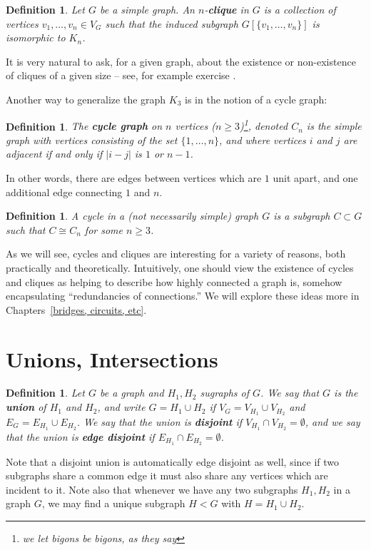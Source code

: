 \documentclass[12pt]{report}
\theoremstyle{plain}
\newtheorem{defn}[thm]{Definition}
\newcommand{\Xb}[1]{\textbf{#1}\index{#1}}
\begin{document}
\begin{defn}
Let $G$ be a simple graph. An $n$-\Xb{clique} in $G$ is a collection of
vertices $v_1, \ldots, v_n \in V_G$ such that the induced subgraph
$G[\{v_1, \ldots, v_n\}]$ is isomorphic to $K_n$.
\end{defn}

It is very natural to ask, for a given graph, about the existence or
non-existence of cliques of a given size -- see, for example exercise
\label{ramsey 6}.

Another way to generalize the graph $K_3$ is in the notion of a cycle graph:
\begin{defn}
The \Xb{cycle graph} on $n$ vertices ($n \geq 3$)\footnote{we let bigons be
bigons, as they say}, denoted $C_n$ is the simple graph with vertices
consisting of the set $\{1, \ldots, n\}$, and where vertices $i$ and $j$
are adjacent if and only if $|i - j|$ is $1$ or $n-1$.
\end{defn}
In other words, there are edges between vertices which are $1$ unit apart,
and one additional edge connecting $1$ and $n$.

\begin{defn}
A cycle in a (not necessarily simple) graph $G$ is a subgraph $C \subset G$
such that $C \cong C_n$ for some $n \geq 3$.
\end{defn}

As we will see, cycles and cliques are interesting for a variety of
reasons, both practically and theoretically. Intuitively,
one should view the existence of cycles and cliques as helping to describe
how highly connected a graph is, somehow encapsulating ``redundancies of
connections.'' We will explore these ideas more in Chapters~\ref{bridges,
circuits, etc}.

\section{Unions, Intersections}

\begin{defn}
Let $G$ be a graph and $H_1, H_2$ sugraphs of $G$. We say that $G$ is the
\textbf{union} of $H_1$ and $H_2$, and write $G = H_1
\cup H_2$ if $V_G = V_{H_1} \cup V_{H_2}$ and $E_G = E_{H_1} \cup
E_{H_2}$. We say that the union is \textbf{disjoint}
if $V_{H_1} \cap V_{H_2} = \emptyset$, and we say that the union is
\textbf{edge disjoint} if $E_{H_1} \cap
E_{H_2} = \emptyset$.
\end{defn}
Note that a disjoint union is automatically edge disjoint as well, since if
two subgraphs share a common edge it must also share any vertices which are
incident to it. Note also that whenever we have any two subgraphs $H_1,
H_2$ in a graph $G$, we may find a unique subgraph $H < G$ with $H = H_1
\cup H_2$. 
\end{document}
